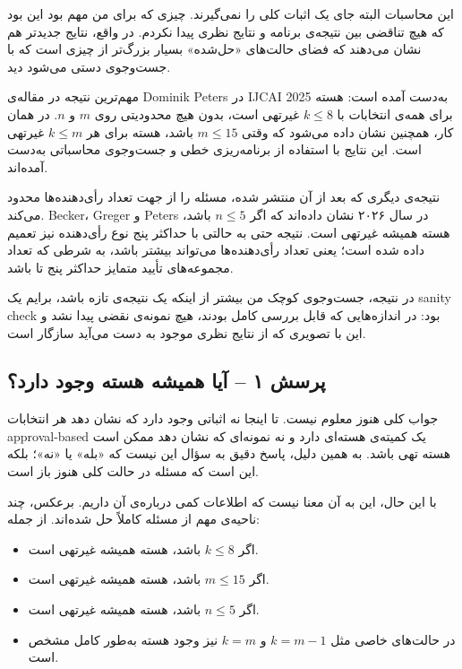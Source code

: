 \documentclass[12pt, a4paper]{article}
\begin{document}
این محاسبات البته جای یک اثبات کلی را نمی‌گیرند. چیزی که برای من مهم بود این بود که هیچ تناقضی بین نتیجه‌ی برنامه و نتایج نظری پیدا نکردم. در واقع، نتایج جدیدتر هم نشان می‌دهند که فضای حالت‌های «حل‌شده» بسیار بزرگ‌تر از چیزی است که با جست‌وجوی دستی می‌شود دید.

مهم‌ترین نتیجه در مقاله‌ی Dominik Peters در IJCAI 2025 به‌دست آمده است: هسته برای همه‌ی انتخابات با $k\le 8$ غیرتهی است، بدون هیچ محدودیتی روی $m$ و $n$. در همان کار، همچنین نشان داده می‌شود که وقتی $m\le15$ باشد، هسته برای هر $k\le m$ غیرتهی است. این نتایج با استفاده از برنامه‌ریزی خطی و جست‌وجوی محاسباتی به‌دست آمده‌اند. \cite{peters2025core}

نتیجه‌ی دیگری که بعد از آن منتشر شده، مسئله را از جهت تعداد رأی‌دهنده‌ها محدود می‌کند. Becker، Greger و Peters در سال ۲۰۲۶ نشان داده‌اند که اگر $n\le5$ باشد، هسته همیشه غیرتهی است. نتیجه حتی به حالتی با حداکثر پنج نوع رأی‌دهنده نیز تعمیم داده شده است؛ یعنی تعداد رأی‌دهنده‌ها می‌تواند بیشتر باشد، به شرطی که تعداد مجموعه‌های تأیید متمایز حداکثر پنج تا باشد. \cite{becker2026core}

در نتیجه، جست‌وجوی کوچک من بیشتر از اینکه یک نتیجه‌ی تازه باشد، برایم یک sanity check بود: در اندازه‌هایی که قابل بررسی کامل بودند، هیچ نمونه‌ی نقضی پیدا نشد و این با تصویری که از نتایج نظری موجود به دست می‌آید سازگار است.

\subsection{پرسش ۱ -- آیا همیشه هسته وجود دارد؟}

جواب کلی هنوز معلوم نیست. تا اینجا نه اثباتی وجود دارد که نشان دهد هر انتخابات approval-based یک کمیته‌ی هسته‌ای دارد و نه نمونه‌ای که نشان دهد ممکن است هسته تهی باشد. به همین دلیل، پاسخ دقیق به سؤال این نیست که «بله» یا «نه»؛ بلکه این است که مسئله در حالت کلی هنوز باز است.

با این حال، این به آن معنا نیست که اطلاعات کمی درباره‌ی آن داریم. برعکس، چند ناحیه‌ی مهم از مسئله کاملاً حل شده‌اند. از جمله:

\begin{itemize}
\item اگر $k\le8$ باشد، هسته همیشه غیرتهی است.
\item اگر $m\le15$ باشد، هسته همیشه غیرتهی است.
\item اگر $n\le5$ باشد، هسته همیشه غیرتهی است.
\item در حالت‌های خاصی مثل $k=m-1$ و $k=m$ نیز وجود هسته به‌طور کامل مشخص است.
\end{itemize}
\end{document}

